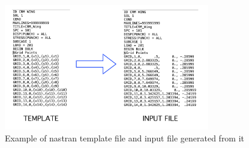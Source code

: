 \begin{figure}[H]
	\centering
	\includegraphics[width = 0.8\textwidth]{./Immagini/2_4.png}
	\caption{Example of nastran template file and input file generated from it}
	\label{fig:2_4}
\end{figure}
